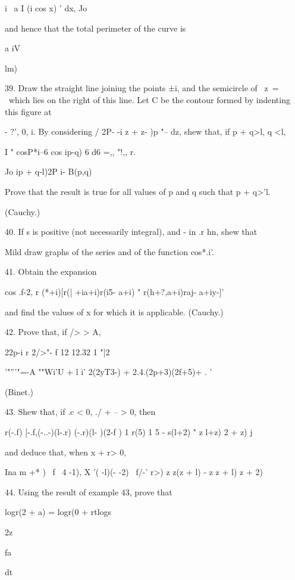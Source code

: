 i~ a I (i cos x) ' dx, Jo

and hence that the total perimeter of the curve is

a iV

lm)\

%
%

39. Draw the straight line joiniug the points ±i, and the semicircle
of \ z\ = \ which lies on the right of this line. Let C be the contour
formed by indenting this figure at

- ?', 0, i. By considering / 2P- -i z + z- )p "-- dz, shew that, if p
+ q>l, q <l,

I " cosP*i--6 cos ip-q) 6 d6 =,, "!,, r.

Jo ip + q-l)2P i- B(p,q)

Prove that the result is true for all values of p and q such that p +
q>'l.

(Cauchy.)

40. If s is positive (not necessarily integral), and - in .r hn, shew
that

Mild draw graphs of the series and of the function cos*.i'.

41. Obtain the expansion

cos .f-2, r (*+i)[r(| +ia+i)r(i5- a+i) " r(h+?,a+i)raj- a+iy-]'

and find the values of x for which it is applicable. (Cauchy.)

42. Prove that, if /> > A,

22p-i r 2/>"- f 12 12.32 1 "|2

'"'''"=-A ""Wi'U + l i' 2(2yT3-) + 2.4.(2p+3)(2f+5)+ . '

(Binet.)

43. Shew that, if .c < 0, ./ + -- > 0, then

r(-.f) [-.f,(-..-)(l-.r) (-.r)(l- )(2-f ) 1 r(5) 1 5 - s(l+2) " z
l+z) 2 + z) j

and deduce that, when x + r> 0,

  Ina m +* ) \ f \ 4   -1), X '( -l)(- -2) \ f/-' r>) z z(z +
l) - z z + l) z + 2)  

44. Using the result of example 43, prove that

logr(2 + a) = logr(0 + rtlogs

2z

fa

dt

